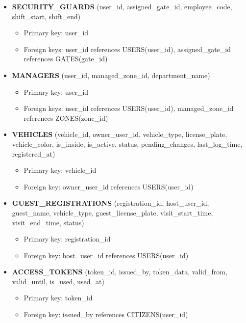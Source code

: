 \documentclass[a4paper]{article}
\begin{document}
\begin{itemize}
    \item \textbf{SECURITY\_GUARDS} (user\_id, assigned\_gate\_id, employee\_code, shift\_start, shift\_end)
    \begin{itemize}
        \item Primary key: user\_id
        \item Foreign keys: user\_id references USERS(user\_id), assigned\_gate\_id references GATES(gate\_id)
    \end{itemize}

    \item \textbf{MANAGERS} (user\_id, managed\_zone\_id, department\_name)
    \begin{itemize}
        \item Primary key: user\_id
        \item Foreign keys: user\_id references USERS(user\_id), managed\_zone\_id references ZONES(zone\_id)
    \end{itemize}

    \item \textbf{VEHICLES} (vehicle\_id, owner\_user\_id, vehicle\_type, license\_plate, vehicle\_color, is\_inside, is\_active, status, pending\_changes, last\_log\_time, registered\_at)
    \begin{itemize}
        \item Primary key: vehicle\_id
        \item Foreign key: owner\_user\_id references USERS(user\_id)
    \end{itemize}

    \item \textbf{GUEST\_REGISTRATIONS} (registration\_id, host\_user\_id, guest\_name, vehicle\_type, guest\_license\_plate, visit\_start\_time, visit\_end\_time, status)
    \begin{itemize}
        \item Primary key: registration\_id
        \item Foreign key: host\_user\_id references USERS(user\_id)
    \end{itemize}

    \item \textbf{ACCESS\_TOKENS} (token\_id, issued\_by, token\_data, valid\_from, valid\_until, is\_used, used\_at)
    \begin{itemize}
        \item Primary key: token\_id
        \item Foreign key: issued\_by references CITIZENS(user\_id)
    \end{itemize}


\end{itemize}
\end{document}
